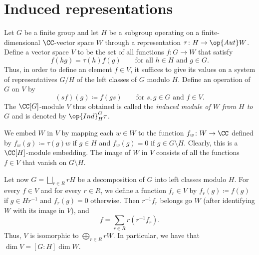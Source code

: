 \documentclass[../main.tex]{subfiles}
\begin{document}
\section{Induced representations}
Let $G$ be a finite group and let $H$ be a subgroup operating on a finite-dimensional $\CC$-vector space $W$ through a representation $\tau\colon H\to\op{Aut}W$. Define a vector space $V$ to be the set of all functions $f\colon G\to W$ that satisfy
\[f(hg)=\tau(h)f(g)\qquad\text{for all }h\in H\text{ and }g\in G.\]
Thus, in order to define an element $f\in V$, it suffices to give its values on a system of representatives $G/H$ of the left classes of $G$ modulo $H$. Define an operation of $G$ on $V$ by
\[(sf)(g)\coloneqq f(gs)\qquad\text{for }s,g\in G\text{ and }f\in V.\]
The $\CC[G]$-module $V$ thus obtained is called the \textit{induced module of $W$ from $H$ to $G$} and is denoted by $\op{Ind}^G_H\tau$.

We embed $W$ in $V$ by mapping each $w\in W$ to the function $f_w\colon W\to\CC$ defined by $f_w(g)\coloneqq\tau(g)w$ if $g\in H$ and $f_w(g)=0$ if $g\in G\setminus H$. Clearly, this is a $\CC[H]$-module embedding. The image of $W$ in $V$ consists of all the functions $f\in V$ that vanish on $G\setminus H$.

Let now $G=\bigsqcup_{r\in R}rH$ be a decomposition of $G$ into left classes modulo $H$. For every $f\in V$ and for every $r\in R$, we define a function $f_r\in V$ by $f_r(g)\coloneqq f(g)$ if $g\in Hr^{-1}$ and $f_r(g)=0$ otherwise. Then $r^{-1}f_r$ belongs go $W$ (after identifying $W$ with its image in $V$), and
\[f=\sum_{r\in R}r\left(r^{-1}f_r\right).\]
Thus, $V$ is isomorphic to $\bigoplus_{r\in R}rW$. In particular, we have that $\dim V=[G:H]\dim W$.
\end{document}
